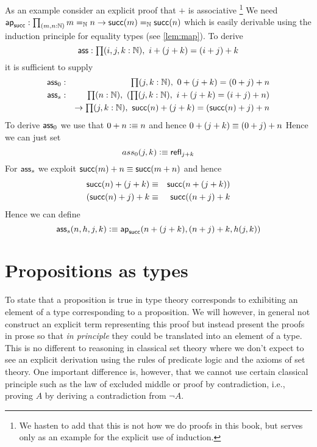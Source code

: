 As an example consider an explicit proof that $+$ is associative
\footnote{We hasten to add that this is not how we do proofs in this
  book, but serves only as an example for the explicit use of induction.}
We need $\apfunc{\suc} : \prd{m,n:\nat} m =_\nat n \to \suc(m) =_\nat \suc(n)$ which is easily derivable using the induction principle for equality types (see \autoref{lem:map}). To derive
\[\ass : \prd{i,j,k:\nat} i + (j + k) = (i + j) + k \]
it is sufficient to supply
\begin{align*}
  \ass_0 & : & \prd{j,k:\nat} 0 + (j + k) = (0+ j) + n \\
  \ass_s & : & \prd{n:\nat}(\prd{j,k:\nat} i + (j + k) = (i + j) + n) \\
  && \to \prd{j,k:\nat} \suc(n) + (j + k) = (\suc(n) + j) + n 
\end{align*}
To derive $\mathsf{ass}_0$ we use that $0+n \vcentcolon\equiv n$ and hence  $0 + (j + k) \equiv (0+ j) + n$ Hence we can just set
\[ ass_0(j,k) \vcentcolon\equiv \mathsf{refl}_{j+k} \]
For $\mathsf{ass}_s$ we exploit $\mathsf{succ}(m)+n \equiv \mathsf{succ}(m+n)$ and hence 
\begin{eqnarray*}
   \mathsf{succ}(n) + (j + k)  & \equiv & \mathsf{succ}(n+(j+k)) \\
   (\mathsf{succ}(n)+j)+k & \equiv & \mathsf{succ}((n+j)+k
\end{eqnarray*}
Hence we can define
\[\mathsf{ass}_s(n,h,j,k) \vcentcolon\equiv \mathsf{ap}_{\mathsf{succ}}(n+(j+k),(n+j)+k,h(j,k)) \]


\section{Propositions as types}
\label{sec:pat}

To state that a proposition is true in type theory corresponds to exhibiting an element of a type corresponding to a proposition. We will however, in general not construct an explicit term representing this proof but instead present the proofs in prose so that \emph{in principle} they could be translated into an element of a type. This is no different to reasoning in classical set theory where we don't expect to see an explicit derivation using the rules of predicate logic and the axioms of set theory. One important difference is, however, that we cannot use certain classical principle such as the law of excluded middle or proof by contradiction, i.e., proving $A$ by deriving a contradiction from $\lnot A$.

